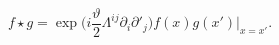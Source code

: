 \begin{equation}\label{eq63:ps}
f\star g=\exp\Big(i\frac{\vartheta}{2}\Lambda^{ij}\partial_{i}\partial'_{j}\Big)f(x)g(x')\Big\vert_{x=x'}.
\end{equation}

